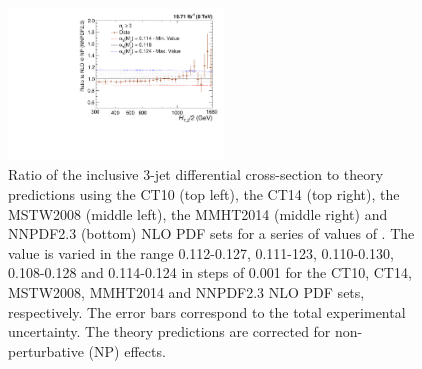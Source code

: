 \begin{figure}[!htbp]
\begin{center}
 \vspace*{3mm}
 \includegraphics[width=0.51\textwidth]{Plots_HT_2_150/Sensitivity_3_ratio_NLO_NNPDF23.pdf}
 \caption{Ratio of the inclusive 3-jet differential cross-section to theory predictions using the CT10 (top left), the CT14 (top right), the MSTW2008 (middle left), the MMHT2014 (middle right) and NNPDF2.3 (bottom) NLO PDF sets for a series of values of \alpsmz. The \alpsmz value is varied in the range 0.112-0.127, 0.111-123, 0.110-0.130, 0.108-0.128 and 0.114-0.124 in steps of 0.001 for the CT10, CT14, MSTW2008, MMHT2014 and NNPDF2.3 NLO PDF sets, respectively. The error bars correspond to the total experimental uncertainty. The theory predictions are corrected for non-perturbative (NP) effects.}
 \label{fig:sensitivity_3}
 \end{center}
\end{figure}

